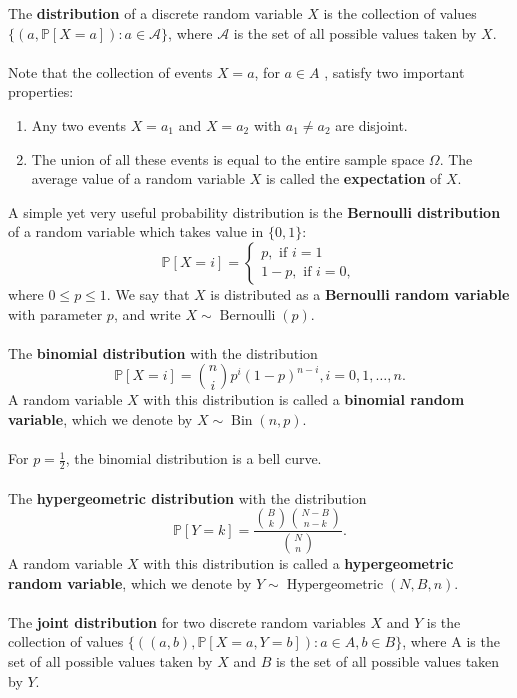 \documentclass{article}
\theoremstyle{definition}
\DeclareMathOperator{\Berno}{Bernoulli}
\DeclareMathOperator{\Bin}{Bin}
\DeclareMathOperator{\HyperG}{Hypergeometric}
\begin{document}
The \textbf{distribution} of a discrete random variable $X$ is the collection of values $\{(a,\mathbb{P}[X = a]) : a \in \mathcal{A} \}$, where $\mathcal{A}$ is the set of all possible values taken by $X$. \\ \\
Note that the collection of events $X = a$, for $a \in A$ , satisfy two important properties: \begin{enumerate}
    \item Any two events $X = a_1$ and $X = a_2$ with $a_1 \neq a_2$ are disjoint.
    \item The union of all these events is equal to the entire sample space $\Omega$.
The average value of a random variable $X$ is called the \textbf{expectation} of $X$. \\
\end{enumerate}
A simple yet very useful probability distribution is the \textbf{Bernoulli distribution} of a random variable which takes value in $\{ 0, 1 \}$: $$\mathbb{P}[X = i] = \begin{cases}  p, \text{ if } i = 1 \\
1 - p, \text{ if } i = 0, \end{cases}$$ where $0 \leq p \leq 1$. We say that $X$ is distributed as a \textbf{Bernoulli random variable} with parameter $p$, and write $X \sim \Berno(p)$. \\ \\
The \textbf{binomial distribution} with the distribution $$\mathbb{P}[X = i] = {n \choose i} p^i (1 - p)^{n - i}, i = 0, 1, \dots, n.$$ A random variable $X$ with this distribution is called a \textbf{binomial random variable}, which we denote by $X \sim \Bin(n, p).$ \\ \\
For $p = \frac{1}{2}$, the binomial distribution is a bell curve. \\ \\
The \textbf{hypergeometric distribution} with the distribution $$\mathbb{P}[Y = k] = \frac{{B \choose k}{N - B \choose n - k}}{{N \choose n}}.$$ A random variable $X$ with this distribution is called a \textbf{hypergeometric random variable}, which we denote by $Y \sim \HyperG(N, B, n)$. \\ \\
The \textbf{joint distribution} for two discrete random variables $X$ and $Y$ is the collection of values $\{((a,b),\mathbb{P}[X = a, Y = b]) : a \in A , b \in B\}$, where A is the set of all possible values taken by $X$ and $B$ is the set of all possible values taken by $Y$. \\ \\
\end{document}
